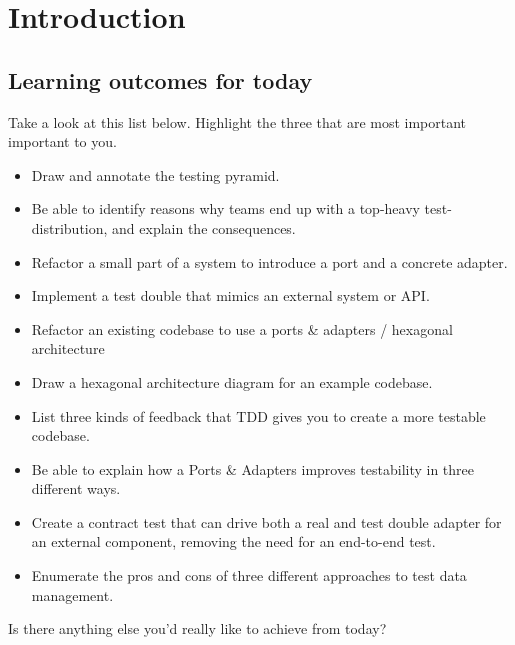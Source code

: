 \chapter*{Introduction}


\section*{Learning outcomes for today}

Take a look at this list below. Highlight the three that are most important important to you.

\begin{itemize}
    \item Draw and annotate the testing pyramid.
    \item Be able to identify reasons why teams end up with a top-heavy test-distribution, and explain the consequences.
    \item Refactor a small part of a system to introduce a port and a concrete adapter.
    \item Implement a test double that mimics an external system or API.
    \item Refactor an existing codebase to use a ports \& adapters / hexagonal architecture
    \item Draw a hexagonal architecture diagram for an example codebase.
    \item List three kinds of feedback that TDD gives you to create a more testable codebase.
    \item Be able to explain how a Ports \& Adapters improves testability in three different ways.
    \item Create a contract test that can drive both a real and test double adapter for an external component, removing the need for an end-to-end test.
    \item Enumerate the pros and cons of three different approaches to test data management.
\end{itemize}

Is there anything else you'd really like to achieve from today?

